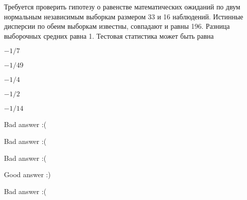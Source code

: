 
\begin{question}
Требуется проверить гипотезу о равенстве математических ожиданий по двум
нормальным независимым выборкам размером 33 и 16 наблюдений. Истинные
дисперсии по обеим выборкам известны, совпадают и равны 196. Разница
выборочных средних равна 1. Тестовая статистика может быть равна
\begin{answerlist}
  \item \(-1/7\)
  \item \(-1/49\)
  \item \(-1/4\)
  \item \(-1/2\)
  \item \(-1/14\)
\end{answerlist}
\end{question}

\begin{solution}
\begin{answerlist}
  \item Bad answer :(
  \item Bad answer :(
  \item Bad answer :(
  \item Good answer :)
  \item Bad answer :(
\end{answerlist}
\end{solution}

